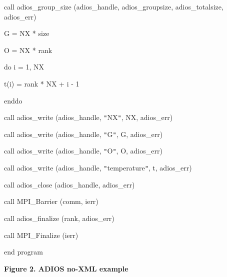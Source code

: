call adios\_group\_size (adios\_handle, adios\_groupsize, adios\_totalsize, adios\_err)

\parindent=28pt
G = NX * size

\parindent=14pt
O = NX * rank

do i = 1, NX

\parindent=43pt
t(i)  = rank * NX + i - 1

\parindent=14pt
enddo

call adios\_write (adios\_handle, \texttt{"}NX\texttt{"}, NX, adios\_err)

\parindent=28pt
call adios\_write (adios\_handle, \texttt{"}G\texttt{"}, G, adios\_err)

\parindent=14pt
call adios\_write (adios\_handle, \texttt{"}O\texttt{"}, O, adios\_err)

call adios\_write (adios\_handle, \texttt{"}temperature\texttt{"}, t, adios\_err)

\parindent=28pt
call adios\_close (adios\_handle, adios\_err)

\parindent=14pt
call MPI\_Barrier (comm, ierr)

call adios\_finalize (rank, adios\_err)

\parindent=28pt
call MPI\_Finalize (ierr)

\parindent=0pt
end program


\leftskip=18pt
{\color{color20} \textbf{Figure 2. ADIOS no-XML example\label{HToc182553363}}}
